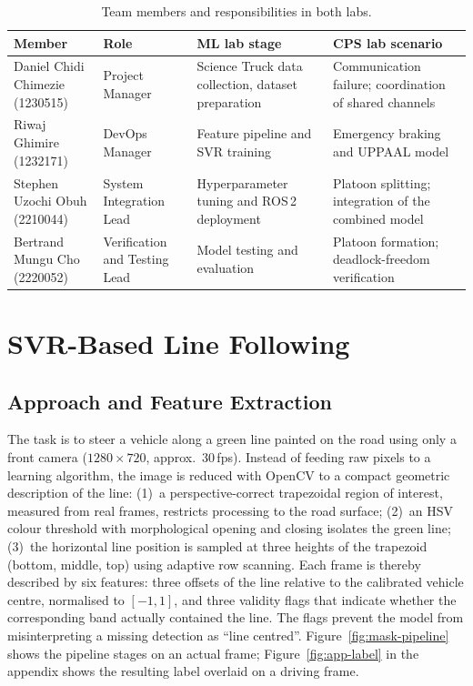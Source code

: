 \documentclass[english]{lni}
\begin{document}
\begin{table}[H]
\centering
\caption{Team members and responsibilities in both labs.}
\label{tab:team}
\renewcommand{\arraystretch}{1.6}
\setlength{\tabcolsep}{5pt}
\begin{tabular}{L{3.3cm}L{2.0cm}L{2.9cm}L{3.0cm}}
\toprule
Member & Role & ML lab stage & CPS lab scenario \\
\midrule
Daniel Chidi Chimezie (1230515) & Project Manager & Science Truck data collection, dataset preparation & Communication failure; coordination of shared channels \\
Riwaj Ghimire   (1232171) & DevOps Manager & Feature pipeline and SVR training & Emergency braking and UPPAAL model \\
Stephen Uzochi Obuh (2210044) & System Integration Lead & Hyperparameter tuning and ROS\,2 deployment & Platoon splitting; integration of the combined model \\
Bertrand Mungu Cho (2220052) & Verification and Testing Lead & Model testing and evaluation & Platoon formation; deadlock-freedom verification \\
\bottomrule
\end{tabular}
\renewcommand{\arraystretch}{1}
\end{table}

\section{SVR-Based Line Following}\label{sec:svm}

\subsection{Approach and Feature Extraction}
The task is to steer a vehicle along a green line painted on the road using only a front camera ($1280 \times 720$, approx.\ 30\,fps). Instead of feeding raw pixels to a learning algorithm, the image is reduced with OpenCV to a compact geometric description of the line: (1)~a perspective-correct trapezoidal region of interest, measured from real frames, restricts processing to the road surface; (2)~an HSV colour threshold with morphological opening and closing isolates the green line; (3)~the horizontal line position is sampled at three heights of the trapezoid (bottom, middle, top) using adaptive row scanning. Each frame is thereby described by six features: three offsets of the line relative to the calibrated vehicle centre, normalised to $[-1, 1]$, and three validity flags that indicate whether the corresponding band actually contained the line. The flags prevent the model from misinterpreting a missing detection as ``line centred''. Figure~\ref{fig:mask-pipeline} shows the pipeline stages on an actual frame; Figure~\ref{fig:app-label} in the appendix shows the resulting label overlaid on a driving frame.
\end{document}
